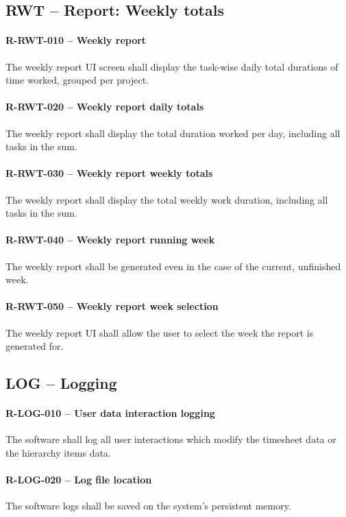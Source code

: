 \subsection{RWT -- Report: Weekly totals}
\paragraph{R-RWT-010 -- Weekly report}
The weekly report \gls{UI} screen shall display the task-wise daily total
durations of time worked, grouped per project.

\paragraph{R-RWT-020 -- Weekly report daily totals}
The weekly report shall display the total duration worked per day, including
all tasks in the sum.

\paragraph{R-RWT-030 -- Weekly report weekly totals}
The weekly report shall display the total weekly work duration, including
all tasks in the sum.

\paragraph{R-RWT-040 -- Weekly report running week}
The weekly report shall be generated even in the case of the current, unfinished
week.

\paragraph{R-RWT-050 -- Weekly report week selection}
The weekly report \gls{UI} shall allow the user to select the week the report is
generated for.

\subsection{LOG -- Logging}
\paragraph{R-LOG-010 -- User data interaction logging}
The software shall log all user interactions which modify the timesheet
data or the hierarchy items data.

\paragraph{R-LOG-020 -- Log file location}
The software logs shall be saved on the system's persistent memory.

